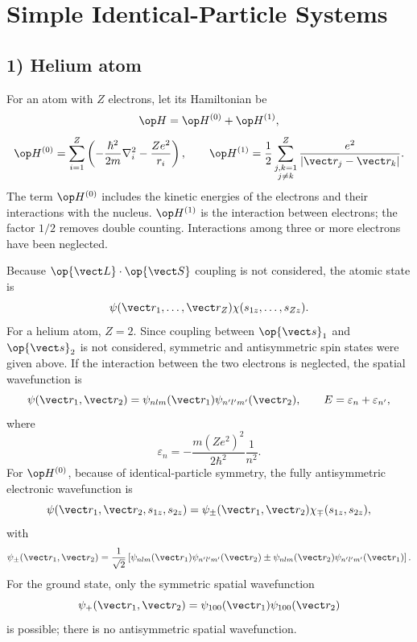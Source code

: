 \section{Simple Identical-Particle Systems}
\subsection*{1) Helium atom}
For an atom with $Z$ electrons, let its Hamiltonian be
\[\op H=\op H^{(0)}+\op H^{(1)},\]
\[\op H^{(0)}=\sum_{i=1}^{Z}\left(
-\frac{\hbar^2}{2m}\nabla_i^2-\frac{Ze^2}{r_i}\right),
\qquad
\op H^{(1)}=\frac12\sum_{\substack{j,k=1\\j\ne k}}^{Z}
\frac{e^2}{|\vect r_j-\vect r_k|}.\]
The term $\op H^{(0)}$ includes the kinetic energies of the electrons and their interactions with the nucleus. $\op H^{(1)}$ is the interaction between electrons; the factor $1/2$ removes double counting. Interactions among three or more electrons have been neglected.

Because $\op{\vect L}\cdot\op{\vect S}$ coupling is not considered, the atomic state is
\[\psi(\vect r_1,\ldots,\vect r_Z)
\chi(s_{1z},\ldots,s_{Zz}).\]
For a helium atom, $Z=2$. Since coupling between $\op{\vect s}_1$ and $\op{\vect s}_2$ is not considered, symmetric and antisymmetric spin states were given above. If the interaction between the two electrons is neglected, the spatial wavefunction is
\[\psi(\vect r_1,\vect r_2)
=\psi_{nlm}(\vect r_1)\psi_{n'l'm'}(\vect r_2),
\qquad E=\varepsilon_n+\varepsilon_{n'},\]
where
\[\varepsilon_n=-\frac{m(Ze^2)^2}{2\hbar^2}\frac1{n^2}.\]
For $\op H^{(0)}$, because of identical-particle symmetry, the fully antisymmetric electronic wavefunction is
\[\psi(\vect r_1,\vect r_2,s_{1z},s_{2z})
=\psi_\pm(\vect r_1,\vect r_2)\chi_\mp(s_{1z},s_{2z}),\]
with
\[\psi_\pm(\vect r_1,\vect r_2)=\frac1{\sqrt2}
\left[\psi_{nlm}(\vect r_1)\psi_{n'l'm'}(\vect r_2)
\pm\psi_{nlm}(\vect r_2)\psi_{n'l'm'}(\vect r_1)\right].\]
For the ground state, only the symmetric spatial wavefunction
\[\psi_+(\vect r_1,\vect r_2)
=\psi_{100}(\vect r_1)\psi_{100}(\vect r_2)\]
is possible; there is no antisymmetric spatial wavefunction.

